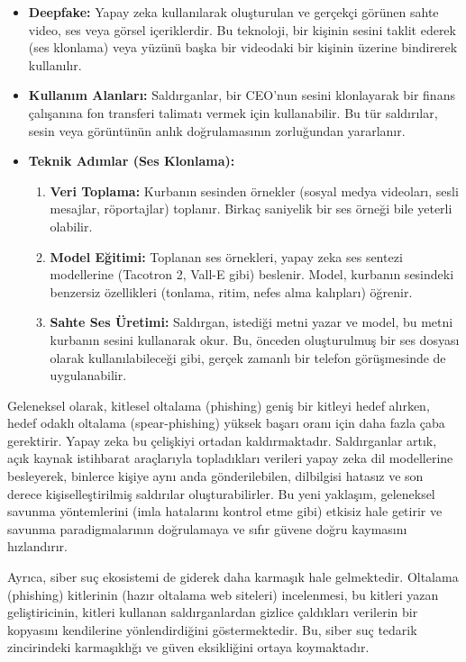 \begin{itemize}
    \item \textbf{Deepfake:} Yapay zeka kullanılarak oluşturulan ve gerçekçi görünen sahte video, ses veya görsel içeriklerdir. Bu teknoloji, bir kişinin sesini taklit ederek (ses klonlama) veya yüzünü başka bir videodaki bir kişinin üzerine bindirerek kullanılır.
    \item \textbf{Kullanım Alanları:} Saldırganlar, bir CEO'nun sesini klonlayarak bir finans çalışanına fon transferi talimatı vermek için kullanabilir. Bu tür saldırılar, sesin veya görüntünün anlık doğrulamasının zorluğundan yararlanır.
    \item \textbf{Teknik Adımlar (Ses Klonlama):}
    \begin{enumerate}
        \item \textbf{Veri Toplama:} Kurbanın sesinden örnekler (sosyal medya videoları, sesli mesajlar, röportajlar) toplanır. Birkaç saniyelik bir ses örneği bile yeterli olabilir.
        \item \textbf{Model Eğitimi:} Toplanan ses örnekleri, yapay zeka ses sentezi modellerine (Tacotron 2, Vall-E gibi) beslenir. Model, kurbanın sesindeki benzersiz özellikleri (tonlama, ritim, nefes alma kalıpları) öğrenir.
        \item \textbf{Sahte Ses Üretimi:} Saldırgan, istediği metni yazar ve model, bu metni kurbanın sesini kullanarak okur. Bu, önceden oluşturulmuş bir ses dosyası olarak kullanılabileceği gibi, gerçek zamanlı bir telefon görüşmesinde de uygulanabilir.
    \end{enumerate}
\end{itemize}

Geleneksel olarak, kitlesel oltalama (phishing) geniş bir kitleyi hedef alırken, hedef odaklı oltalama (spear-phishing) yüksek başarı oranı için daha fazla çaba gerektirir. Yapay zeka bu çelişkiyi ortadan kaldırmaktadır. Saldırganlar artık, açık kaynak istihbarat araçlarıyla topladıkları verileri yapay zeka dil modellerine besleyerek, binlerce kişiye aynı anda gönderilebilen, dilbilgisi hatasız ve son derece kişiselleştirilmiş saldırılar oluşturabilirler. Bu yeni yaklaşım, geleneksel savunma yöntemlerini (imla hatalarını kontrol etme gibi) etkisiz hale getirir ve savunma paradigmalarının doğrulamaya ve sıfır güvene doğru kaymasını hızlandırır.

Ayrıca, siber suç ekosistemi de giderek daha karmaşık hale gelmektedir. Oltalama (phishing) kitlerinin (hazır oltalama web siteleri) incelenmesi, bu kitleri yazan geliştiricinin, kitleri kullanan saldırganlardan gizlice çaldıkları verilerin bir kopyasını kendilerine yönlendirdiğini göstermektedir. Bu, siber suç tedarik zincirindeki karmaşıklığı ve güven eksikliğini ortaya koymaktadır.

